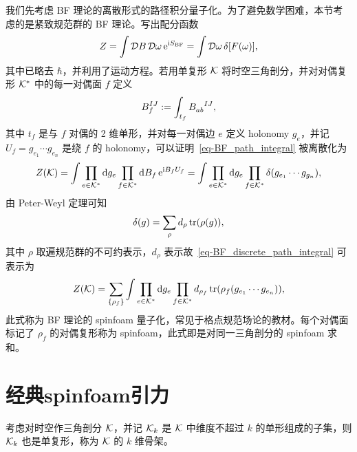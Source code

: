 			\label{sec-BF_spinfoam}
			我们先考虑 BF 理论的离散形式的路径积分量子化。为了避免数学困难，本节考虑的是紧致规范群的 BF 理论。写出配分函数
			\begin{equation}
				Z = \int \mathcal{D}B \,\mathcal{D}\omega \, \mathrm{e}^{\mathrm{i} S_{\text{BF}}} = \int \mathcal{D} \omega \, \delta[F(\omega)],\label{eq-BF_path_integral}
			\end{equation}
			其中已略去 $\hbar$，并利用了运动方程。若用单复形 $\mathcal{K}$ 将时空三角剖分，并对对偶复形 $\mathcal{K}^*$ 中的每一对偶面 $f$ 定义
			\begin{equation}
				\tensor*{B}{_f^I^J} \definedby \int_{t_f} \tensor{B}{_a_b^I^J},
			\end{equation}
			其中 $t_f$ 是与 $f$ 对偶的 2 维单形，并对每一对偶边 $e$ 定义 holonomy $g_e$，并记 $U_f = g_{e_1} \cdots g_{e_n}$ 是绕 $f$ 的 holonomy，可以证明~\eqref{eq-BF_path_integral} 被离散化为
			\begin{equation}
				Z(\mathcal{K}) = \int \prod_{e\in \mathcal{K}^*} \dd{g_e} \prod_{f\in \mathcal{K}^*} \dd{B_f} \mathrm{e}^{\mathrm{i} B_f U_f} = \int \prod_{e\in \mathcal{K}^*} \dd{g_e} \prod_{f\in \mathcal{K}^*} \delta(g_{e_1} \cdots g_{g_n}),\label{eq-BF_discrete_path_integral}
			\end{equation}
			由 Peter-Weyl 定理可知
			\begin{equation}
				\delta(g) = \sum_{\rho} d_\rho \tr(\rho(g)),
			\end{equation}
			其中 $\rho$ 取遍规范群的不可约表示，$d_\rho$ 表示故~\eqref{eq-BF_discrete_path_integral} 可表示为
			\begin{equation}
				Z(\mathcal{K}) = \sum_{\left\{ \rho_f \right\}} \int \prod_{e\in \mathcal{K}^*} \dd{g_e} \prod_{f\in \mathcal{K}^*} d_{\rho_f} \tr(\rho_f(g_{e_1} \cdots g_{e_n})),
			\end{equation}
			此式称为 BF 理论的 spinfoam 量子化，常见于格点规范场论的教材。每个对偶面标记了 $\rho_f$ 的对偶复形称为 spinfoam，此式即是对同一三角剖分的 spinfoam 求和。

		\section{经典spinfoam引力}

			考虑对时空作三角剖分 $\mathcal{K}$，并记 $\mathcal{K}_k$ 是 $\mathcal{K}$ 中维度不超过 $k$ 的单形组成的子集，则 $\mathcal{K}_k$ 也是单复形，称为 $\mathcal{K}$ 的 $k$ 维骨架。

